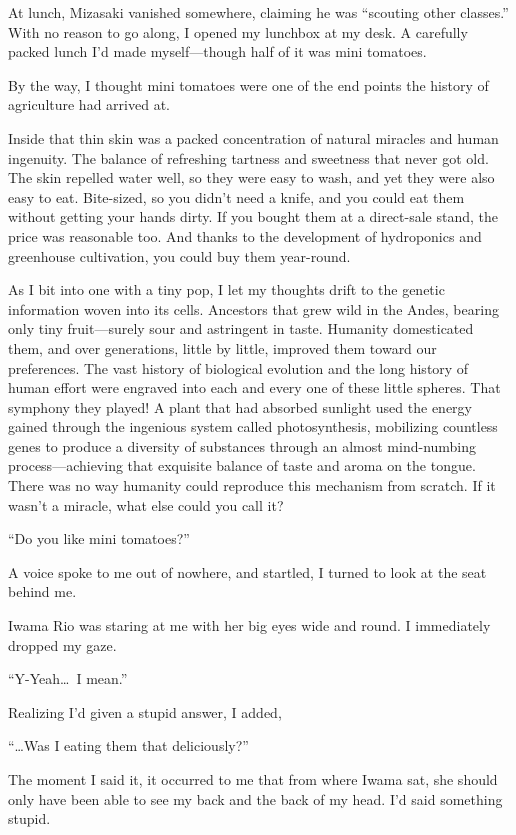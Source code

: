 \documentclass[
    a4paper,
    12pt,
    twoside,
    openany,
    UTF8,
    fontset=windows
]{ctexbook}
\begin{document}
At lunch, Mizasaki vanished somewhere, claiming he was ``scouting other classes.'' With no reason to go along, I opened my lunchbox at my desk. A carefully packed lunch I'd made myself---though half of it was mini tomatoes.

By the way, I thought mini tomatoes were one of the end points the history of agriculture had arrived at.

Inside that thin skin was a packed concentration of natural miracles and human ingenuity. The balance of refreshing tartness and sweetness that never got old. The skin repelled water well, so they were easy to wash, and yet they were also easy to eat. Bite-sized, so you didn't need a knife, and you could eat them without getting your hands dirty. If you bought them at a direct-sale stand, the price was reasonable too. And thanks to the development of hydroponics and greenhouse cultivation, you could buy them year-round.

As I bit into one with a tiny pop, I let my thoughts drift to the genetic information woven into its cells. Ancestors that grew wild in the Andes, bearing only tiny fruit---surely sour and astringent in taste. Humanity domesticated them, and over generations, little by little, improved them toward our preferences. The vast history of biological evolution and the long history of human effort were engraved into each and every one of these little spheres. That symphony they played! A plant that had absorbed sunlight used the energy gained through the ingenious system called photosynthesis, mobilizing countless genes to produce a diversity of substances through an almost mind-numbing process---achieving that exquisite balance of taste and aroma on the tongue. There was no way humanity could reproduce this mechanism from scratch. If it wasn't a miracle, what else could you call it?

``Do you like mini tomatoes?''

A voice spoke to me out of nowhere, and startled, I turned to look at the seat behind me.

Iwama Rio was staring at me with her big eyes wide and round. I immediately dropped my gaze.

``Y-Yeah\dots\ I mean.''

Realizing I'd given a stupid answer, I added,

``\dots Was I eating them that deliciously?''

The moment I said it, it occurred to me that from where Iwama sat, she should only have been able to see my back and the back of my head. I'd said something stupid.
\end{document}
